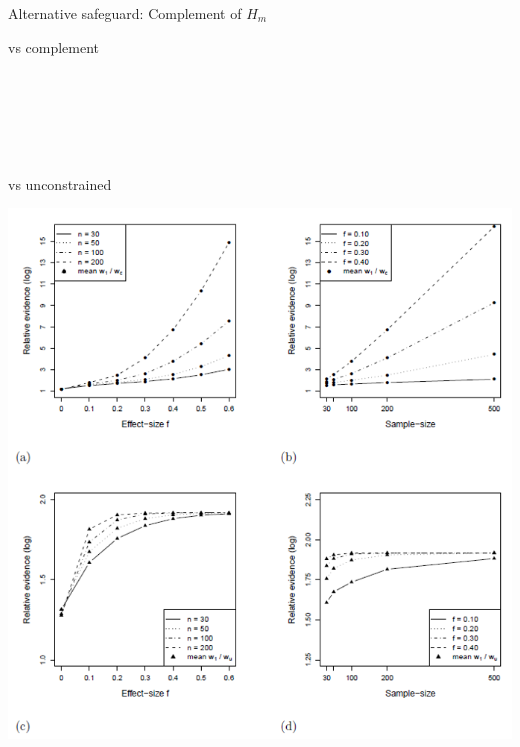\documentclass[10pt]{beamer}\usepackage[]{graphicx}\usepackage[]{xcolor}
\begin{document}
\begin{frame}{Alternative safeguard: Complement of $H_m$}%
	\parbox[h]{0.31\textwidth}{
		vs complement\\
		\\
		\\
		\\
		\\
		\\
		\\
		vs unconstrained
	}
	\parbox[h]{0.68\textwidth}{
		\includegraphics[scale = 0.35]{Weigth_Compl_and_Hu.png}
	}
\end{frame}
%
\end{document}
